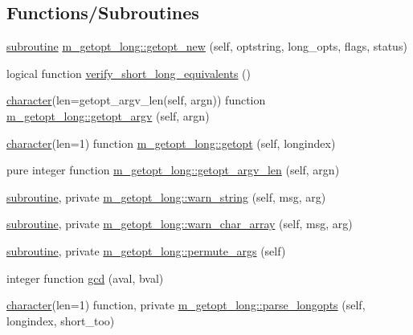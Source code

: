 \subsection*{Functions/\+Subroutines}
\begin{DoxyCompactItemize}
\item 
\hyperlink{M__stopwatch_83_8txt_acfbcff50169d691ff02d4a123ed70482}{subroutine} \hyperlink{namespacem__getopt__long_af5aeba1b29425c5da2db9113aac0dc97}{m\+\_\+getopt\+\_\+long\+::getopt\+\_\+new} (self, optstring, long\+\_\+opts, flags, status)
\item 
logical function \hyperlink{M__getopt__long_8f90_aa269c37cf5c19077d40736e1d0557e3d}{verify\+\_\+short\+\_\+long\+\_\+equivalents} ()
\item 
\hyperlink{option__stopwatch_83_8txt_abd4b21fbbd175834027b5224bfe97e66}{character}(len=getopt\+\_\+argv\+\_\+len(self, argn)) function \hyperlink{namespacem__getopt__long_a7bd7b84d1aeda27b57f33b81a93ef1c1}{m\+\_\+getopt\+\_\+long\+::getopt\+\_\+argv} (self, argn)
\item 
\hyperlink{option__stopwatch_83_8txt_abd4b21fbbd175834027b5224bfe97e66}{character}(len=1) function \hyperlink{namespacem__getopt__long_ae12838b4ea1d076090a8bbd9f05000ef}{m\+\_\+getopt\+\_\+long\+::getopt} (self, longindex)
\item 
pure integer function \hyperlink{namespacem__getopt__long_a379b13093de969a83f29283c3cce3c7a}{m\+\_\+getopt\+\_\+long\+::getopt\+\_\+argv\+\_\+len} (self, argn)
\item 
\hyperlink{M__stopwatch_83_8txt_acfbcff50169d691ff02d4a123ed70482}{subroutine}, private \hyperlink{namespacem__getopt__long_a78f4dacb7eae96d7e259544003ae0dfd}{m\+\_\+getopt\+\_\+long\+::warn\+\_\+string} (self, msg, arg)
\item 
\hyperlink{M__stopwatch_83_8txt_acfbcff50169d691ff02d4a123ed70482}{subroutine}, private \hyperlink{namespacem__getopt__long_af1ccef432aa194687e03575a68537553}{m\+\_\+getopt\+\_\+long\+::warn\+\_\+char\+\_\+array} (self, msg, arg)
\item 
\hyperlink{M__stopwatch_83_8txt_acfbcff50169d691ff02d4a123ed70482}{subroutine}, private \hyperlink{namespacem__getopt__long_a55045492836fd218379126cbdcee24ea}{m\+\_\+getopt\+\_\+long\+::permute\+\_\+args} (self)
\item 
integer function \hyperlink{M__getopt__long_8f90_a45f7c3be12facd750a4b03528039d66c}{gcd} (aval, bval)
\item 
\hyperlink{option__stopwatch_83_8txt_abd4b21fbbd175834027b5224bfe97e66}{character}(len=1) function, private \hyperlink{namespacem__getopt__long_a7bad6d8d4067d578429da9282bc82ada}{m\+\_\+getopt\+\_\+long\+::parse\+\_\+longopts} (self, longindex, short\+\_\+too)
\end{DoxyCompactItemize}
